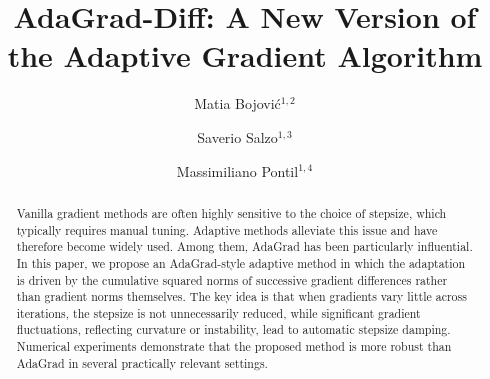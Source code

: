 \documentclass[11pt]{article}
\title{AdaGrad-Diff: A New Version of the Adaptive Gradient Algorithm}
\author{
Matia Bojovi\'c$^{1,2}$ \and
Saverio Salzo$^{1,3}$ \and 
Massimiliano Pontil$^{1,4}$
}
\date{} %
\theoremstyle{plain}
\theoremstyle{definition}
\theoremstyle{remark}
\newcommand{\massi}[2][]{\todo[color=brown!20,#1]{{\bf MP:} #2}}
\newcommand{\matia}[2][]{\todo[color=red!20,#1]{{\bf MB:} #2}}
\begin{document}
\maketitle


\begin{abstract}
\noindent
Vanilla gradient methods are often highly sensitive to the choice of stepsize, which typically requires manual tuning. Adaptive methods alleviate this issue and have therefore become widely used. Among them, AdaGrad has been particularly influential. In this paper, we propose an AdaGrad-style adaptive method in which the adaptation is driven by the cumulative squared norms of successive gradient differences rather than gradient norms themselves. The key idea is that when gradients vary little across iterations, the stepsize is not unnecessarily reduced, while significant gradient fluctuations, reflecting curvature or instability, lead to automatic stepsize damping. Numerical experiments demonstrate that the proposed method is more robust than AdaGrad in several practically relevant settings.

\end{abstract}
\end{document}
